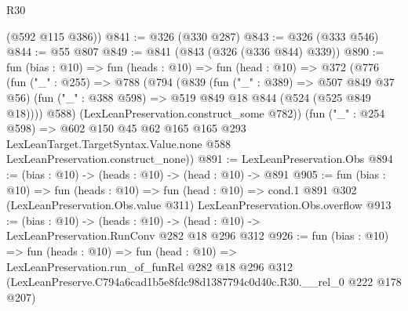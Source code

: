 \begin{lexlean}{R30}
\begin{coremodule}
      (@592 @115 @386))
@841 := @326 (@330 @287)
@843 := @326 (@333 @546)
@844 := @55 @807
@849 := @841 (@843 (@326 (@336 @844) @339))
@890 := fun (bias : @10) =>
  fun (heads : @10) =>
  fun (head : @10) =>
  @372
    (@776
      (fun ("_" : @255) =>
      @788
        (@794
          (@839
            (fun ("_" : @389) => @507 @849 @37 @56)
            (fun ("_" : @388 @598) => @519 @849 @18 @844 (@524 (@525 @849 @18))))
          @588)
        (LexLeanPreservation.construct_some @782))
      (fun ("_" : @254 @598) =>
      @602
        @150
        @45
        @62
        @165
        @165
        @293
        LexLeanTarget.TargetSyntax.Value.none
        @588
        LexLeanPreservation.construct_none))
@891 := LexLeanPreservation.Obs
@894 := (bias : @10) -> (heads : @10) -> (head : @10) -> @891
@905 := fun (bias : @10) =>
  fun (heads : @10) =>
  fun (head : @10) =>
  cond.{1} @891 @302 (LexLeanPreservation.Obs.value @311) LexLeanPreservation.Obs.overflow
@913 := (bias : @10) ->
  (heads : @10) -> (head : @10) -> LexLeanPreservation.RunConv @282 @18 @296 @312
@926 := fun (bias : @10) =>
  fun (heads : @10) =>
  fun (head : @10) =>
  LexLeanPreservation.run_of_funRel
    @282
    @18
    @296
    @312
    (LexLeanPreserve.C794a6cad1b5e8fdc98d1387794c0d40c.R30.__rel_0 @222 @178 @207)
\end{coremodule}
\end{lexlean}

